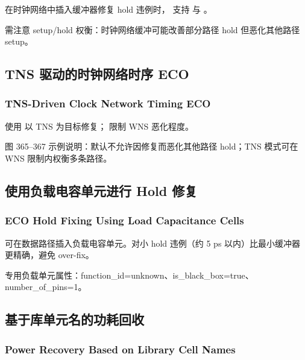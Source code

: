 在时钟网络中插入缓冲器修复 hold 违例时， 支持  与 。

需注意 setup/hold 权衡：时钟网络缓冲可能改善部分路径 hold 但恶化其他路径 setup。

\subsection{TNS 驱动的时钟网络时序 ECO}
\subsubsection*{TNS-Driven Clock Network Timing ECO}

使用  以 TNS 为目标修复； 限制 WNS 恶化程度。

图 365--367 示例说明：默认不允许因修复而恶化其他路径 hold；TNS 模式可在 WNS 限制内权衡多条路径。




\subsection{使用负载电容单元进行 Hold 修复}
\subsubsection*{ECO Hold Fixing Using Load Capacitance Cells}

  可在数据路径插入负载电容单元。对小 hold 违例（约 5 ps 以内）比最小缓冲器更精确，避免 over-fix。

专用负载单元属性：function_id=unknown、is_black_box=true、number_of_pins=1。


\subsection{基于库单元名的功耗回收}
\subsubsection*{Power Recovery Based on Library Cell Names}

